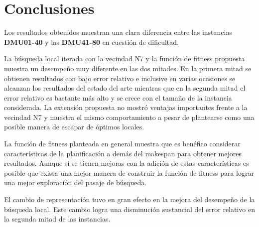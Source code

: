 \section{Conclusiones}
Los resultados obtenidos muestran una clara diferencia entre las instancias \textbf{DMU01-40} y las \textbf{DMU41-80} en cuestión de dificultad. 

La búsqueda local iterada con la vecindad N7 y la función de fitness propuesta muestra un desempeño muy diferente en las dos mitades. En la primera mitad se obtienen resultados con bajo error relativo e inclusive en varias ocasiones se alcanzan los resultados del estado del arte mientras que en la segunda mitad el error relativo es bastante más alto y se crece con el tamaño de la instancia considerada. 
La extensión propuesta no mostró ventajas importantes frente a la vecindad N7 y muestra el mismo comportamiento a pesar de plantearse como una posible manera de escapar de óptimos locales. 

La función de fitness planteada en general muestra que es benéfico considerar características de la planificación a demás del makespan para obtener mejores resultados. Aunque sí se tienen mejoras con la adición de estas características es posible que exista una mejor manera de construir la función de fitness para lograr una mejor exploración del pasaje de búsqueda.

El cambio de representación tuvo en gran efecto en la mejora del desempeño de la búsqueda local. Este cambio logra una disminución sustancial del error relativo en la segunda mitad de las instancias. 
